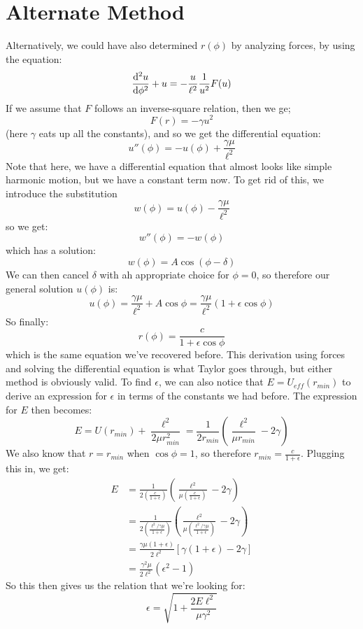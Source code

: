 \section{Alternate Method} 
Alternatively, we could have also determined $r(\phi)$ by analyzing forces, by using the equation:
\[ \dv[2]{u}{\phi} + u = -\frac{u}{\ell^2}\frac{1}{u^2}F(u)\] 
If we assume that $F$ follows an inverse-square relation, then we ge;
\[ F(r) = -\gamma u^2\]
(here $\gamma$ eats up all the constants), and so we get the differential equation: 
\[ u''(\phi) = -u(\phi) + \frac{\gamma \mu}{\ell^2}\]
Note that here, we have a differential equation that almost looks like simple harmonic motion, but we have a 
constant term now. To get rid of this, we introduce the substitution
\[ w(\phi) = u(\phi) - \frac{\gamma \mu}{\ell^2}\]
so we get:
\[ w''(\phi) = -w(\phi)\] 
which has a solution: 
\[ w(\phi) = A \cos(\phi - \delta)\]
We can then cancel $\delta$ with ah appropriate choice for $\phi = 0$, so therefore our general solution $u(\phi)$
is:
\[ u(\phi) = \frac{\gamma \mu}{\ell^2} + A \cos \phi = \frac{\gamma \mu}{\ell^2}(1 + \epsilon \cos \phi)\]
So finally: 
\[ r(\phi) = \frac{c}{1 + \epsilon \cos \phi}\]
which is the same equation we've recovered before. This derivation using forces and solving the differential 
equation is what Taylor goes through, but either method is obviously valid. To find $\epsilon$, we can also notice
that $E = U_{eff}(r_{min})$ to derive an expression for $\epsilon$ in terms of the constants we had before. The 
expression for $E$ then becomes: 
\[ E = U(r_{min}) + \frac{\ell^2}{2 \mu r_{min}^2} = \frac{1}{2r_{min}}\left( \frac{\ell^2}{\mu r_{min}} 
- 2\gamma \right) \]
We also know that $r = r_{min}$ when $\cos \phi = 1$, so therefore $r_{min} = \frac{c}{1 + \epsilon}$. Plugging
this in, we get:
\begin{align*}
		E &= \frac{1}{2\left( \frac{c}{1 + \epsilon} \right) }\left( \frac{\ell^2}{\mu\left( \frac{c}{1 +
			\epsilon} \right) }- 2 \gamma\right)\\
			&= \frac{1}{2\left( \frac{\ell^2/\gamma \mu}{1 +
			\epsilon}\right)}\left( \frac{\ell^2}{\mu\left( \frac{\ell^2/ \gamma \mu}{1 +
			\epsilon}\right) } - 2 \gamma \right) \\
			&= \frac{\gamma \mu (1 + \epsilon)}{2\ell^2}[\gamma(1 + \epsilon) - 2 \gamma] \\
			&= \frac{\gamma^2\mu}{2\ell^2}(\epsilon^2 - 1)
\end{align*}
So this then gives us the relation that we're looking for:
\[ \epsilon = \sqrt{1 + \frac{2E\ell^2}{\mu \gamma^2}} \]
